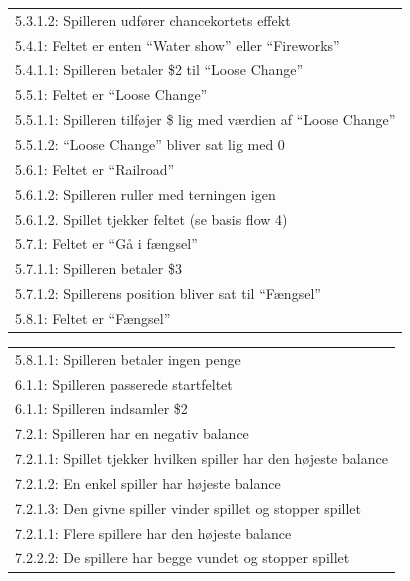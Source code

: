 \begin{table}[H]
\begin{tabular}{|p{14cm}|}
        5.3.1.2: Spilleren udfører chancekortets effekt \\
        5.4.1: Feltet er enten “Water show” eller “Fireworks”\\
        5.4.1.1: Spilleren betaler \$2 til “Loose Change” \\
        5.5.1: Feltet er “Loose Change” \\
        5.5.1.1: Spilleren tilføjer \$ lig med værdien af “Loose Change” \\
        5.5.1.2: “Loose Change” bliver sat lig med 0 \\
        5.6.1: Feltet er “Railroad” \\
        5.6.1.2: Spilleren ruller med terningen igen \\
        5.6.1.2. Spillet tjekker feltet (se basis flow 4) \\
        5.7.1: Feltet er “Gå i fængsel” \\
        5.7.1.1: Spilleren betaler \$3 \\
        5.7.1.2: Spillerens position bliver sat til “Fængsel” \\
        5.8.1: Feltet er “Fængsel” \\
        \hline
    \end{tabular}
\end{table}
\begin{table}[H]
    \renewcommand{\arraystretch}{1.5}
    \centering
    \begin{tabular}{|p{14cm}|} \\
        5.8.1.1: Spilleren betaler ingen penge \\
        6.1.1: Spilleren passerede startfeltet \\
        6.1.1: Spilleren indsamler \$2 \\
        7.2.1: Spilleren har en negativ balance \\
        7.2.1.1: Spillet tjekker hvilken spiller har den højeste balance \\
        7.2.1.2: En enkel spiller har højeste balance \\
        7.2.1.3: Den givne spiller vinder spillet og stopper spillet \\
        7.2.1.1: Flere spillere har den højeste balance \\
        7.2.2.2: De spillere har begge vundet og stopper spillet \\
        \hline
    \end{tabular}
\end{table}

